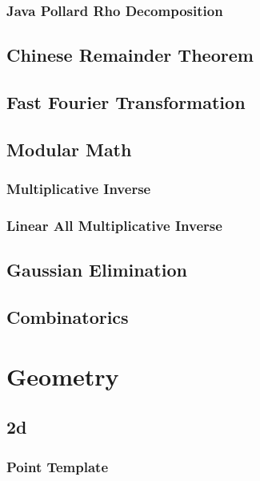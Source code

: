 \documentclass[10pt,a4paper]{report}
\begin{document}
		\subsection{Java Pollard Rho Decomposition}
			
		
	\section{Chinese Remainder Theorem}
	
	\newpage
	\section{Fast Fourier Transformation}
		
	
	\section{Modular Math}
		\subsection{Multiplicative Inverse}
		\subsection{Linear All Multiplicative Inverse}
	
	\section{Gaussian Elimination}
	
	\section{Combinatorics}
	
\chapter{Geometry}
	\section{2d}
		\subsection{Point Template}
			
		\newpage
\end{document}
